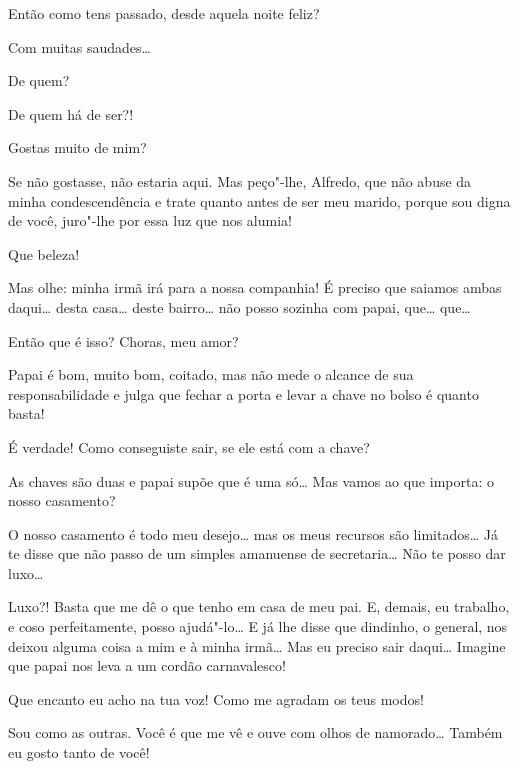  
Então como tens passado, desde aquela noite feliz?

  Com muitas saudades\ldots

 De quem?

 De quem há de ser?!

 Gostas muito de
mim?

 Se não gostasse, não estaria aqui. Mas peço"-lhe,
Alfredo, que não abuse da minha
condescendência e trate quanto antes de ser meu
marido, porque sou digna de você, juro"-lhe por essa
luz que nos alumia!

 Que beleza!

 Mas olhe: minha
irmã irá para a nossa companhia! É
preciso que saiamos ambas daqui\ldots{} desta casa\ldots{} deste
bairro\ldots{} não posso sozinha com papai, que\ldots{} que\ldots{} 

 Então que é isso? Choras, meu amor?

 Papai é
bom, muito bom, coitado, mas não mede o
alcance de sua responsabilidade e julga que fechar a porta e
levar a chave no bolso é quanto basta!

 É verdade! Como
conseguiste sair, se ele está com a chave?

 As chaves
são duas e papai supõe que
é uma só\ldots{}  Mas
vamos ao que importa: o nosso casamento?

 O nosso casamento
é todo meu desejo\ldots{} 
mas os meus recursos são limitados\ldots{} Já te
disse que não passo de um simples amanuense de
secretaria\ldots{} Não te posso dar luxo\ldots

 Luxo?! Basta que
me dê o que tenho em casa de meu pai. E, demais, eu
trabalho, e coso perfeitamente, posso ajudá"-lo\ldots{} E já
lhe disse que dindinho, o general, nos deixou alguma coisa a
mim e à minha irmã\ldots{} Mas eu
preciso sair daqui\ldots{} Imagine que papai nos leva a um cordão
carnavalesco!

 Que encanto eu
acho na tua voz! Como me agradam os teus modos!

 Sou como as
outras. Você é que me vê e ouve com
olhos de namorado\ldots{} Também eu gosto tanto de
você!

